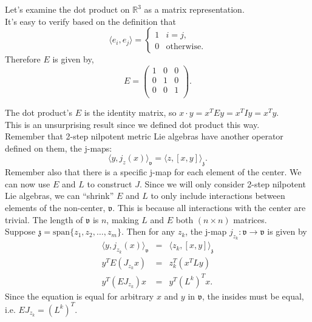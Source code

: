 \documentclass[11 pt]{article}
\newcommand{\br}[2]{\left[#1,#2\right]}
\newcommand{\inp}[2]{\langle #1, #2 \rangle}
\newcommand{\fz}{\mathfrak{z}}
\newcommand{\fv}{\mathfrak{v}}
\newcommand{\RR}{\mathbb{R}}
\begin{document}
    \begin{example}
        Let's examine the dot product on $\RR^3$ as a matrix representation.
        \\It's easy to verify based on the definition that
        $$
        \inp{e_i}{e_j}
        = \begin{cases}
            1 & i = j, \\
            0 & \text{otherwise}.
        \end{cases}
        $$
        Therefore $E$ is given by,
        $$
        E = \begin{pmatrix}
            1 & 0 & 0\\
            0 & 1 & 0\\
            0 & 0 & 1\\
        \end{pmatrix}.
        $$
    \end{example}
    The dot product's $E$ is the identity matrix, so
    $x \cdot y = x^{T}Ey = x^{T}Iy = x^{T}y$.
    \\This is an unsurprising result since we defined dot product this way.
    \\Remember that 2-step nilpotent metric Lie algebras have another operator
    defined on them, the j-maps:
    $$
    \inp{y}{j_z(x)}_\fv = \inp{z}{\br{x}{y}}_\fz.
    $$
    Remember also that there is a specific j-map for each element of the
    center.  We can now use $E$ and $L$ to construct $J$.
    Since we will only consider 2-step nilpotent Lie algebras, we can
    ``shrink'' $E$ and $L$ to only include interactions between elements of
    the non-center, $\fv$.  This is because all interactions with the center
    are trivial. The length of $\fv$ is $n$, making $L$ and $E$ both
    $(n \times n)$ matrices.
    \smallskip
    \\Suppose $\fz = \text{span} \{ z_1,z_2,\hdots,z_m \}$.  Then for any $z_k$,
    the j-map $j_{z_k}: \fv \to \fv$ is given by
    \begin{eqnarray*}
        \inp{y}{j_{z_k}(x)}_\fv	& = & \inp{z_k}{\br{x}{y}}_\fz \\
        y^T E (J_{z_k}x)		& = & z_k^T (x^TLy)\\
        y^T (E J_{z_k}) x		& = & y^T(L^k)^T x.
    \end{eqnarray*}
    Since the equation is equal for arbitrary $x$ and $y$ in $\fv$,
    the insides must be equal, i.e. $EJ_{z_k} = (L^k)^T$.
\end{document}
